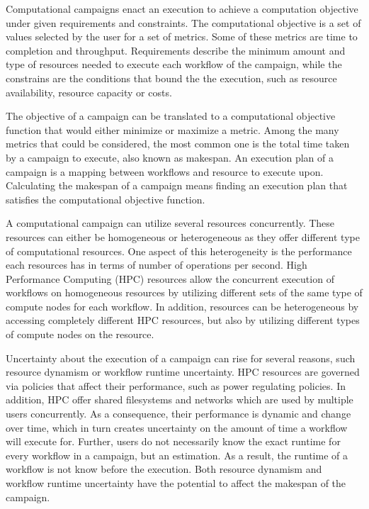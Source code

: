 \label{ch:campaigns}
Computational campaigns enact an execution to achieve a computation objective under given requirements and constraints.
The computational objective is a set of values selected by the user for a set of metrics.
Some of these metrics are time to completion and throughput.
Requirements describe the minimum amount and type of resources needed to execute each workflow of the campaign, while the constrains are the conditions that bound the the execution, such as resource availability, resource capacity or costs.

The objective of a campaign can be translated to a computational objective function that would either minimize or maximize a metric.
Among the many metrics that could be considered, the most common one is the total time taken by a campaign to execute, also known as makespan.
An execution plan of a campaign is a mapping between workflows and resource to execute upon.
Calculating the makespan of a campaign means finding an execution plan that satisfies the computational objective function.

A computational campaign can utilize several resources concurrently.
These resources can either be homogeneous or heterogeneous as they offer different type of computational resources.
One aspect of this heterogeneity is the performance each resources has in terms of number of operations per second.
High Performance Computing (HPC) resources allow the concurrent execution of workflows on homogeneous resources by utilizing different sets of the same type of compute nodes for each workflow.
In addition, resources can be heterogeneous by accessing completely different HPC resources, but also by utilizing different types of compute nodes on the resource.

Uncertainty about the execution of a campaign can rise for several reasons, such resource dynamism or workflow runtime uncertainty.
HPC resources are governed via policies that affect their performance, such as power regulating policies.
In addition, HPC offer shared filesystems and networks which are used by multiple users concurrently.
As a consequence, their performance is dynamic and change over time, which in turn creates uncertainty on the amount of time a workflow will execute for.
Further, users do not necessarily know the exact runtime for every workflow in a campaign, but an estimation.
As a result, the runtime of a workflow is not know before the execution.
Both resource dynamism and workflow runtime uncertainty have the potential to affect the makespan of the campaign.

